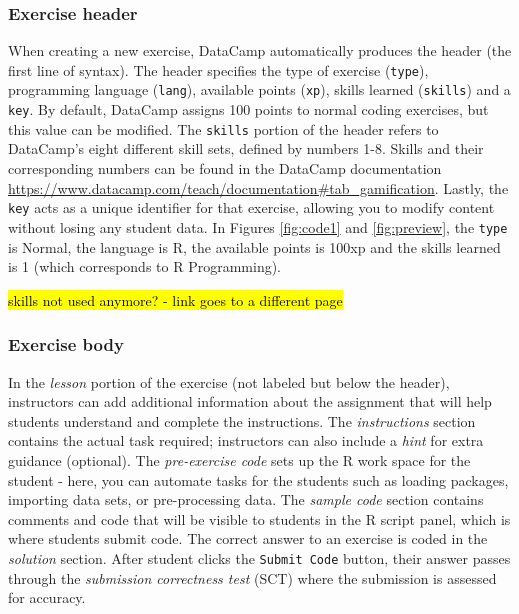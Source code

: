\documentclass{tise_style_doi}
\begin{document}
\subsubsection{Exercise header}

When creating a new exercise, DataCamp automatically produces the header (the first line
of syntax). The header specifies the type of exercise (\texttt{type}), programming
language (\texttt{lang}), available points (\texttt{xp}), skills learned (\texttt{skills})
and a \texttt{key}. By default, DataCamp assigns 100 points to normal coding exercises,
but this value can be modified. The \texttt{skills} portion of the header refers to DataCamp's
eight different skill sets, defined by numbers 1-8. Skills and their corresponding
numbers can be found in the DataCamp documentation
\url{https://www.datacamp.com/teach/documentation#tab_gamification}.
Lastly, the \texttt{key} acts as a unique identifier for that exercise, allowing you
to modify content without losing any student data. In Figures \ref{fig:code1} and
\ref{fig:preview}, the \texttt{type} is Normal, the language is R,
the available points is 100xp and the skills learned is 1 (which corresponds to R Programming).

\hl{skills not used anymore? - link goes to a different page}

\subsubsection{Exercise body}

In the \textit{lesson} portion of the exercise (not labeled but below the header),
instructors can add additional information about the assignment that will help
students understand and complete the instructions. The \textit{instructions} section
contains the actual task required; instructors can also include
a \textit{hint} for extra guidance (optional). The \textit{pre-exercise code} sets up
the R work space for the student - here, you can automate tasks for the students such
as loading packages, importing data sets, or pre-processing data. The \textit{sample code}
section contains comments and code that will be visible to students in the R script
panel, which is where students submit code.  The correct answer to an exercise is
coded in the \textit{solution} section.  After student clicks the \texttt{Submit Code}
 button, their answer passes through the \textit{submission correctness test} (SCT)
where the submission is assessed for accuracy.
\end{document}
